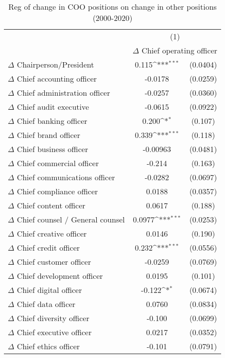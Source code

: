 {
\def\sym#1{\ifmmode^{#1}\else\(^{#1}\)\fi}
\begin{longtable}{l*{1}{cc}}
\caption{Reg of change in COO positions on change in other positions (2000-2020)}\\
\toprule\endfirsthead\midrule\endhead\midrule\endfoot\endlastfoot
                &\multicolumn{2}{c}{(1)}     \\
                &\multicolumn{2}{c}{$\Delta$ Chief operating officer}\\
\midrule
$\Delta$ Chairperson/President&    0.115\sym{***}& (0.0404)\\
$\Delta$ Chief accounting officer&  -0.0178         & (0.0259)\\
$\Delta$ Chief administration officer&  -0.0257         & (0.0360)\\
$\Delta$ Chief audit executive&  -0.0615         & (0.0922)\\
$\Delta$ Chief banking officer&    0.200\sym{*}  &  (0.107)\\
$\Delta$ Chief brand officer&    0.339\sym{***}&  (0.118)\\
$\Delta$ Chief business officer& -0.00963         & (0.0481)\\
$\Delta$ Chief commercial officer&   -0.214         &  (0.163)\\
$\Delta$ Chief communications officer&  -0.0282         & (0.0697)\\
$\Delta$ Chief compliance officer&   0.0188         & (0.0357)\\
$\Delta$ Chief content officer&   0.0617         &  (0.188)\\
$\Delta$ Chief counsel / General counsel&   0.0977\sym{***}& (0.0253)\\
$\Delta$ Chief creative officer&   0.0146         &  (0.190)\\
$\Delta$ Chief credit officer&    0.232\sym{***}& (0.0556)\\
$\Delta$ Chief customer officer&  -0.0259         & (0.0769)\\
$\Delta$ Chief development officer&   0.0195         &  (0.101)\\
$\Delta$ Chief digital officer&   -0.122\sym{*}  & (0.0674)\\
$\Delta$ Chief data officer&   0.0760         & (0.0834)\\
$\Delta$ Chief diversity officer&   -0.100         & (0.0699)\\
$\Delta$ Chief executive officer&   0.0217         & (0.0352)\\
$\Delta$ Chief ethics officer&   -0.101         & (0.0791)\\

\end{longtable}}
